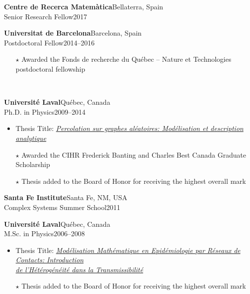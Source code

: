 \documentclass[11pt]{article}
\newcommand{\TitreSection}[1]{\colorbox{background}{\makebox[\textwidth-0.5em][c]{\Large\textrm{\textsc{#1}}}}\vspace{0.75\baselineskip}\\}
\begin{document}
%
\parbox[t]{\textwidth}{%
\textbf{Centre de Recerca Matem\`atica}\hfill Bellaterra, Spain\\
Senior Research Fellow\hfill 2017%
\vspace{0.25\baselineskip}\\}
%
\parbox[t]{\textwidth}{%
\textbf{Universitat de Barcelona}\hfill Barcelona, Spain\\
Postdoctoral Fellow\hfill 2014--2016
\begin{itemize}[leftmargin=1.5em]\small
  \item[$\star$] Awarded the Fonds de recherche du Qu\'ebec -- Nature et Technologies postdoctoral fellowship
\end{itemize}
}
%
%
%
%
%
\newpage\noindent%
\TitreSection{Education}
%
\parbox[t]{\textwidth}{%
\textbf{Universit\'e Laval}\hfill Qu\'ebec, Canada\\
Ph.D. in Physics\hfill 2009--2014
\begin{itemize}[leftmargin=1.5em]\small
  \item Thesis Title: \href{http://hdl.handle.net/20.500.11794/25058}{\textit{Percolation sur graphes al\'eatoires: Mod\'elisation et description analytique}}\footnotemark
  \item[$\star$] Awarded the CIHR Frederick Banting and Charles Best Canada Graduate Scholarship
  \item[$\star$] Thesis added to the Board of Honor for receiving the highest overall mark
\end{itemize}}
%
\parbox[t]{\textwidth}{%
\textbf{Santa Fe Institute}\hfill Santa Fe, NM, USA\\
Complex Systems Summer School\hfill 2011\\}
%
\parbox[t]{\textwidth}{%
\textbf{Universit\'e Laval}\hfill Qu\'ebec, Canada\\
M.Sc. in Physics\hfill 2006--2008
\begin{itemize}[leftmargin=1.5em]\small
  \item Thesis Title: \href{http://hdl.handle.net/20.500.11794/20317}{\textit{Mod\'elisation Math\'ematique en Epid\'emiologie par R\'eseaux de Contacts: Introduction\\de l'H\'et\'erog\'en\'eit\'e dans la Transmissibilit\'e}}\footnotemark
  \item[$\star$] Thesis added to the Board of Honor for receiving the highest overall mark
\end{itemize}}
\end{document}

